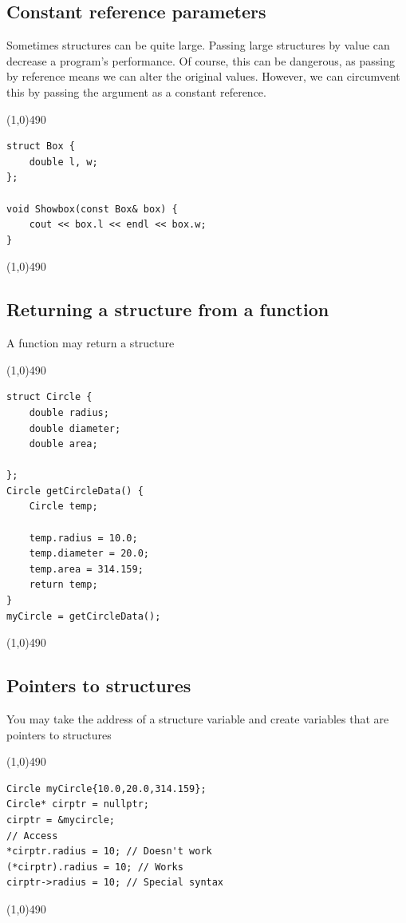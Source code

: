 \documentclass{report}
\begin{document}
	\subsection{Constant reference parameters}
	\bigbreak \noindent 
	\begin{concept}
	   Sometimes structures can be quite large. Passing large structures by value can decrease a program's performance. Of course, this can be dangerous, as passing by reference means we can alter the original values. However, we can circumvent this by passing the argument as a constant reference.
	\end{concept}
	\bigbreak \noindent 
	\line(1,0){490}
	\begin{verbatim}
struct Box {
    double l, w;
};

void Showbox(const Box& box) {
    cout << box.l << endl << box.w;
}
	\end{verbatim}
	\line(1,0){490}

	\bigbreak \noindent 
	\subsection{Returning a structure from a function}
	\bigbreak \noindent 
	\begin{concept}
	   A function may return a structure 
	\end{concept}
	\bigbreak \noindent 
	\line(1,0){490}
	\begin{verbatim}
struct Circle {
    double radius;
    double diameter;
    double area;

};
Circle getCircleData() {
    Circle temp;

    temp.radius = 10.0;
    temp.diameter = 20.0;
    temp.area = 314.159;
    return temp;
}
myCircle = getCircleData();
	\end{verbatim}
	\line(1,0){490}

	\pagebreak \bigbreak \noindent 
	\subsection{Pointers to structures}
	\bigbreak \noindent 
	\begin{concept}
	   You may take the address of a structure variable and create variables that are pointers to structures 
	\end{concept}
	\bigbreak \noindent 
	\line(1,0){490}
	\begin{verbatim}
Circle myCircle{10.0,20.0,314.159};
Circle* cirptr = nullptr;
cirptr = &mycircle;
// Access
*cirptr.radius = 10; // Doesn't work
(*cirptr).radius = 10; // Works
cirptr->radius = 10; // Special syntax
	\end{verbatim}
	\line(1,0){490}
	\bigbreak \noindent 
\end{document}
